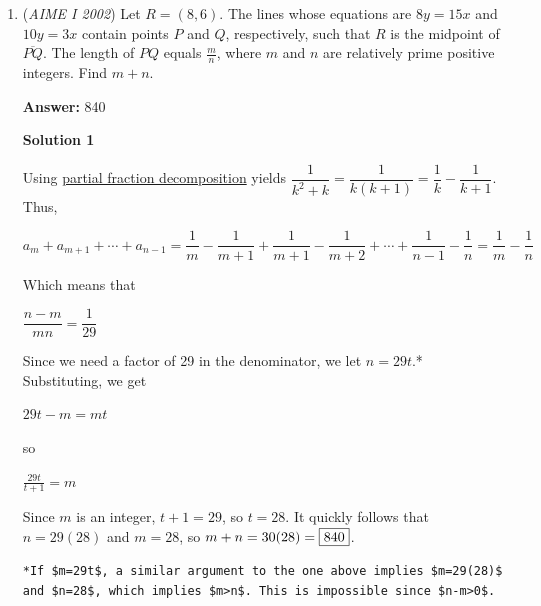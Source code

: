 \begin{enumerate}
 $b = \left\{6, 7, 8, 9\right\}$ which is $4$ ages for this decade.

 
Repeating this process as $a$ gets larger, we get the sum 

 


 ${6 + 5 + 4 + 3 + 2 + 1}$.

 
Adding our numbers, we get $4 + 6 + 5 + \ldots + 2 + 1 = 4 + 21 =  \boxed{025}$. -Exit

 \textbf{Remark} The 25 ordered pairs $(d, n)$ are:(34, 9)(34, 20)(34, 31)(34, 42)(34, 53)(34, 64)(43, 10)(43, 21)(43, 32)(43, 43)(43, 54)(52, 11)(52, 22)(52, 33)(52, 44)(61, 1)(61, 12)(61, 23)(61, 34)(70, 2)(70, 13)(70, 24)(79, 3)(79, 14)(88, 4)~Puck\_0

 


	\item (\textit{AIME I 2002}) Let $R = (8,6)$. The lines whose equations are $8y = 15x$ and $10y = 3x$ contain points $P$ and $Q$, respectively, such that $R$ is the midpoint of $\overline{PQ}$. The length of $PQ$ equals $\frac {m}{n}$, where $m$ and $n$ are relatively prime positive integers. Find $m + n$.


 
 \textbf{Answer: }840



\textbf{Solution 1}

Using \href{https://artofproblemsolving.com/wiki/index.php?title=Partial\_fraction\_decomposition}{partial fraction decomposition} yields $\dfrac{1}{k^2+k}=\dfrac{1}{k(k+1)}=\dfrac{1}{k}-\dfrac{1}{k+1}$. Thus,

 $a_m+a_{m+1}+\cdots +a_{n-1}=\dfrac{1}{m}-\dfrac{1}{m+1}+\dfrac{1}{m+1}-\dfrac{1}{m+2}+\cdots +\dfrac{1}{n-1}-\dfrac{1}{n}=\dfrac{1}{m}-\dfrac{1}{n}$

 Which means that

 $\dfrac{n-m}{mn}=\dfrac{1}{29}$

 Since we need a factor of 29 in the denominator, we let $n=29t$.* Substituting, we get

 $29t-m=mt$

 so

 $\frac{29t}{t+1} = m$

 Since $m$ is an integer, $t+1 = 29$, so $t=28$. It quickly follows that $n=29(28)$ and $m=28$, so $m+n = 30(28) = \fbox{840}$.

 \begin{verbatim}
*If $m=29t$, a similar argument to the one above implies $m=29(28)$ and $n=28$, which implies $m>n$. This is impossible since $n-m>0$.
\end{verbatim}






\end{enumerate}
